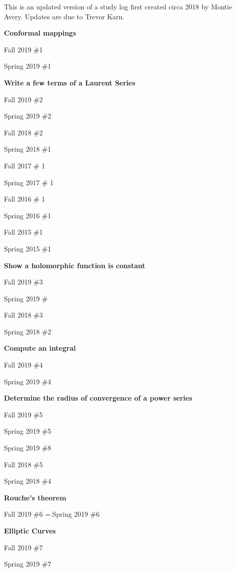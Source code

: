 \documentclass{article}
\begin{document}
\noindent This is an updated version of a study log first created circa 2018 by Montie Avery.
Updates are due to Trevor Karn.

\hfill

\textbf{Conformal mappings}
\begin{todolist}
	\item Fall 2019 \#1
	\item Spring 2019 \#1
\end{todolist}

\textbf{Write a few terms of a Laurent Series}
\begin{todolist}
	\item Fall 2019 \#2
	\item Spring 2019 \#2
	\item Fall 2018 \#2
	\item Spring 2018 \#1
	\item Fall 2017 \# 1
	\item Spring 2017 \# 1
	\item Fall 2016 \# 1
	\item Spring 2016 \#1
	\item Fall 2015 \#1 
	\item Spring 2015 \#1
\end{todolist}

\textbf{Show a holomorphic function is constant}
\begin{todolist}
	\item Fall 2019 \#3
	\item Spring 2019 \#
	\item Fall 2018 \#3
	\item Spring 2018 \#2
\end{todolist}

\textbf{Compute an integral}
\begin{todolist}
	\item Fall 2019 \#4
	\item Spring 2019 \#4
\end{todolist}

\textbf{Determine the radius of convergence of a power series}
\begin{todolist}
	\item Fall 2019 \#5
	\item Spring 2019 \#5
	\item Spring 2019 \#8
	\item Fall 2018 \#5
	\item Spring 2018 \#4
\end{todolist}

\textbf{Rouche's theorem}
\begin{todolist}
	\item Fall 2019 \#6 =.Spring 2019 \#6
	\item 
\end{todolist}

\textbf{Elliptic Curves}
\begin{todolist}
	\item Fall 2019 \#7
	\item Spring 2019 \#7
	\item 
\end{todolist}
\end{document}
